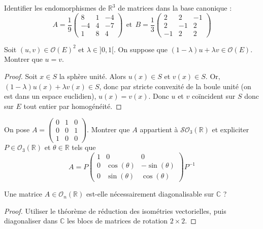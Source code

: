 \documentclass[french,a4paper]{article}
\newcommand{\R}{\mathbb{R}}
\newcommand{\C}{\mathbb{C}}
\newcommand{\inv}{^{-1}}
\theoremstyle{plain}
\theoremstyle{definition}
\theoremstyle{remark}
\begin{document}
\begin{ex}{}
	Identifier les endomorphismes de $\R^3$ de matrices dans la base canonique : $$A=\frac{1}{9}\begin{pmatrix}
		8&1&-4\\
		-4&4&-7\\
		1&8&4
	\end{pmatrix}\ \ \text{et}\ \  B=\frac{1}{3}\begin{pmatrix}
		2&2&-1\\
		2&-1&2\\
		-1&2&2
	\end{pmatrix}$$
\end{ex}

\begin{ex}{}
	Soit $(u,v)\in\mathcal{O}(E)^2$ et $\lambda\in]0,1[$. On suppose que $(1-\lambda)u+\lambda v\in\mathcal{O}(E)$. Montrer que $u=v$.
\end{ex}
\begin{proof}
	Soit $x\in S$ la sphère unité. Alors $u(x)\in S$ et $v(x)\in S$. Or, $(1-\lambda)u(x)+\lambda v(x)\in S$, donc par stricte convexité de la boule unité (on est dans un espace euclidien), $u(x)=v(x)$. Donc $u$ et $v$ coïncident sur $S$ donc sur $E$ tout entier par homogénéité.
\end{proof}

\begin{ex}{}
	On pose $A=\displaystyle\begin{pmatrix}
		0&1&0\\
		0&0&1\\
		1&0&0
	\end{pmatrix}$. Montrer que $A$ appartient à $\mathcal{SO}_3(\R)$ et expliciter $P\in\mathcal{O}_3(\R)$ et $\theta\in\R$ tels que $$A=P\begin{pmatrix}
		1&0&0\\
		0&\cos(\theta)&-\sin(\theta)\\
		0&\sin(\theta)&\cos(\theta)
	\end{pmatrix}P\inv$$
\end{ex}

\begin{ex}{}
	Une matrice $A\in\mathcal{O}_n(\R)$ est-elle nécessairement diagonalisable sur $\C$ ?
\end{ex}
\begin{proof}
	Utiliser le théorème de réduction des isométries vectorielles, puis diagonaliser dans $\C$ les blocs de matrices de rotation $2\times2$.
\end{proof}
\end{document}
